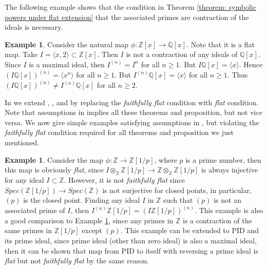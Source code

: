 \documentclass[12pt]{amsart}
\numberwithin{equation}{section}
\theoremstyle{definition}
\newtheorem{example}[theorem]{Example}
\newcommand{\ZZ}{{\mathbb Z}}
\newcommand{\QQ}{{\mathbb Q}}
\begin{document}
 The following example shows that the condition in Theorem \ref{theorem: symbolic powers under flat extension} that the associated primes are contraction of the ideals is necessary. 
 
 \begin{example}\label{example: contraction condition}
 	Consider the natural map $\phi: \ZZ[x] \to \QQ[x]$. Note that it is a flat map. Take $I=\langle x,2\rangle \subset \ZZ[x]$. Then $I$ is not a contraction of any ideals of $\QQ[x]$. Since $I$ is a maximal ideal, then $I^{(n)}=I^n$ for all $n\geqslant1$. But $I \QQ[x]=\langle x \rangle$. Hence $(I \QQ[x])^{(n)}=\langle x^n \rangle $ for all $n\geqslant 1$. But $I^{(n)}\QQ[x]=\langle x\rangle$ for all $n\geqslant 1$.  Thus $ (I \QQ[x])^{(n)} \neq I^{(n)}\QQ[x]$ for all $n\geqslant 2$. 
 \end{example}
 In  we extend \cite[Theorem 3.6]{GHMNmatroid}, \cite[Theorem 4]{Akessesh}, and \cite[proposition 2.1]{walker2018uniform} by replacing the \emph{faithfully flat} condition with \emph{flat} condition. Note that assumptions in  implies all these theorems and proposition, but not vice versa. We now give simple examples satisfying assumptions in , but violating the \emph{faithfully flat} condition required for all theorems and proposition we just mentioned. 
 
 \begin{example}\label{example: flat not faithfully flat 1}
 	Consider  the map $\phi: \ZZ \to \ZZ\left[1 \slash p\right]$, where $p$ is a prime number, then this map is obviously \emph{flat}, since $I \otimes_{\ZZ} \ZZ\left[1 \slash p\right] \to \ZZ \otimes_{\ZZ} \ZZ\left[1 \slash p\right]$ is always injective for any ideal $I \subset \ZZ$. However, it is not \emph{faithfully flat} since $Spec(\ZZ\left[1 \slash p\right]) \to Spec(\ZZ)$ is not surjective for closed points, in particular, $(p)$ is the closed point. Finding any ideal $I$ in $\ZZ$ such that $(p)$ is not an associated prime of $I$, then $I^{(n)} \ZZ\left[1 \slash p\right] = (I \ZZ\left[1 \slash p\right])^{(n)}$. This example is also a good comparison to Example \ref{example: contraction condition}, since any primes in $\ZZ$ is a contraction of the same primes in $\ZZ\left[1 \slash p\right]$ except $(p)$. This example can be extended to PID and its prime ideal, since prime ideal (other than zero ideal) is also a maximal ideal, then it can be shown that map from PID to itself with reversing a prime ideal is \emph{flat} but not \emph{faithfully flat} by the same reason.
 \end{example}
 
\end{document}
